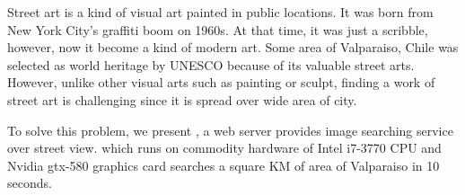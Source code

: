 

Street art is a kind of visual art painted in public locations.
It was born from New York City's graffiti boom on 1960s.
At that time, it was just a scribble, however, now it become a kind of modern art.
Some area of Valparaiso, Chile was selected as world heritage by UNESCO because of its valuable street arts.
However, unlike other visual arts such as painting or sculpt, finding a work of street art is challenging since it is spread over wide area of city.

To solve this problem, we present \name{}, a web server provides image searching service over street view.
\name{} which runs on commodity hardware of Intel i7-3770 CPU and Nvidia gtx-580 graphics card searches a square KM of area of Valparaiso in 10 seconds.
